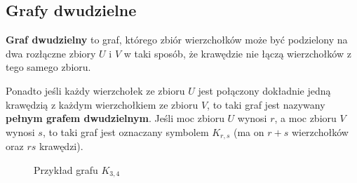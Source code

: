 \subsection*{Grafy dwudzielne}

\textbf{Graf dwudzielny} to graf, którego zbiór wierzchołków może być podzielony na dwa rozłączne zbiory $U$ i $V$ w taki sposób, że krawędzie nie łączą wierzchołków z tego samego zbioru. 

Ponadto jeśli każdy wierzchołek ze zbioru $U$ jest połączony dokładnie jedną krawędzią z każdym wierzchołkiem ze zbioru $V$, to taki graf jest nazywany \textbf{pełnym grafem dwudzielnym}. Jeśli moc zbioru $U$ wynosi $r$, a moc zbioru $V$ wynosi $s$, to taki graf jest oznaczany symbolem $K_{r,s}$ (ma on $r+s$ wierzchołków oraz $rs$ krawędzi).

\begin{figure}[H]
\centering
{}
\captionsetup{justification=centering}
\caption{Przykład grafu $K_{3,4}$} \label{fig:k-3-4-graph-example}
\end{figure}
